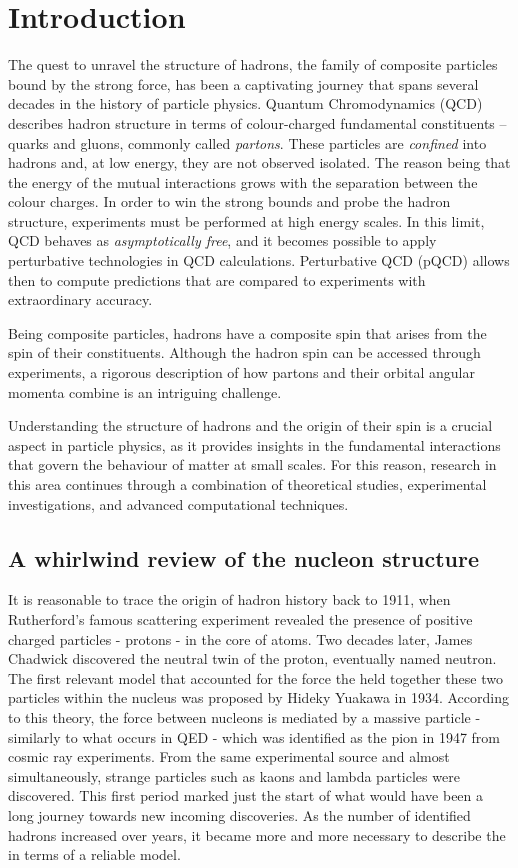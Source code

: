 \chapter{Introduction}
\label{ch:1}

The quest to unravel the structure of hadrons, the family of composite particles bound by the strong force, has been a captivating journey that spans several decades in the history of particle physics. Quantum Chromodynamics (QCD) describes hadron structure in terms of colour-charged fundamental constituents -- quarks and gluons, commonly called \textit{partons}. These particles are \textit{confined} into hadrons and, at low energy, they are not observed isolated. The reason being that the energy of the mutual interactions grows with the separation between the colour charges. In order to win the strong bounds and probe the hadron structure, experiments must be performed at high energy scales. In this limit, QCD  behaves as \textit{asymptotically free}, and it becomes possible to apply perturbative technologies in QCD calculations. Perturbative QCD (pQCD) allows then to compute predictions that are compared to experiments with extraordinary accuracy.%

Being composite particles, hadrons have a composite spin that arises from the spin of their constituents. Although the hadron spin can be accessed through experiments, a rigorous description of how partons and their orbital angular momenta combine is an intriguing challenge.%

Understanding the structure of hadrons and the origin of their spin is a crucial aspect in particle physics, as it provides insights in the fundamental interactions that govern the behaviour of matter at small scales. For this reason, research in this area continues through a combination of theoretical studies, experimental investigations, and advanced computational techniques. 


\section{A whirlwind review of the nucleon structure}

It is reasonable to trace the origin of hadron history back to 1911, when Rutherford's famous scattering experiment revealed the presence of positive charged particles - protons - in the core of atoms. Two decades later, James Chadwick discovered the neutral twin of the proton, eventually named neutron. The first relevant model that accounted for the force the held together these two particles within the nucleus was proposed by Hideky Yuakawa in 1934. According to this theory, the force between nucleons is mediated by a massive particle - similarly to what occurs in QED - which was identified as the pion in 1947 from cosmic ray experiments. From the same experimental source and almost simultaneously, strange particles such as kaons and lambda particles were discovered. This first period marked just the start of what would have been a long journey towards new incoming discoveries. As the number of identified hadrons increased over years, it became more and more necessary to describe the  in terms of a reliable model.%

